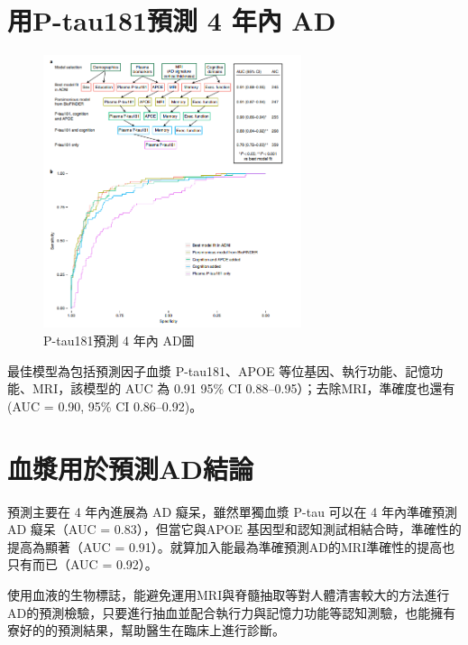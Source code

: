 \section{用P-tau181預測 4 年內 AD }
\begin{figure}[H]
	\centerline{\includegraphics[height=8cm]{pic/AD181.PNG}}
	\caption{P-tau181預測 4 年內 AD圖}
	\label{fig:AD181}
\end{figure}
最佳模型為包括預測因子血漿 P-tau181、APOE 等位基因、執行功能、記憶功能、MRI，該模型的 AUC 為 0.91 95\% CI 0.88–0.95）；去除MRI，準確度也還有 (AUC = 0.90, 95\% CI 0.86–0.92)。


\section{血漿用於預測AD結論}
預測主要在 4 年內進展為 AD 癡呆，雖然單獨血漿 P-tau 可以在 4 年內準確預測 AD 癡呆（AUC = 0.83），但當它與APOE 基因型和認知測試相結合時，準確性的提高為顯著（AUC = 0.91）。就算加入能最為準確預測AD的MRI準確性的提高也只有而已（AUC = 0.92）。

使用血液的生物標誌，能避免運用MRI與脊髓抽取等對人體清害較大的方法進行AD的預測檢驗，只要進行抽血並配合執行力與記憶力功能等認知測驗，也能擁有寮好的的預測結果，幫助醫生在臨床上進行診斷。

